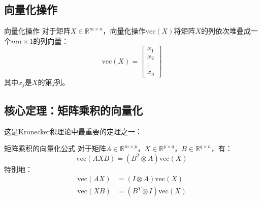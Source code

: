 \documentclass[11pt,a4paper]{ctexart}
\theoremstyle{definition}
\newcommand{\RR}{\mathbb{R}}
\newcommand{\vect}{\text{vec}}
\begin{document}
\subsection{向量化操作}

\begin{importantdef}{向量化操作}
对于矩阵$X \in \RR^{m \times n}$，向量化操作$\vect(X)$将矩阵$X$的列依次堆叠成一个$mn \times 1$的列向量：
$$\vect(X) = \begin{bmatrix} x_1 \\ x_2 \\ \vdots \\ x_n \end{bmatrix}$$
其中$x_j$是$X$的第$j$列。
\end{importantdef}

\subsection{核心定理：矩阵乘积的向量化}

这是Kronecker积理论中最重要的定理之一：

\begin{maintheorem}{矩阵乘积的向量化公式}
对于矩阵$A \in \RR^{m \times p}$，$X \in \RR^{p \times q}$，$B \in \RR^{q \times n}$，有：
$$\vect(AXB) = (B^T \otimes A) \vect(X)$$
特别地：
\begin{align}
\vect(AX) &= (I \otimes A) \vect(X) \\
\vect(XB) &= (B^T \otimes I) \vect(X)
\end{align}
\end{maintheorem}
\end{document}
